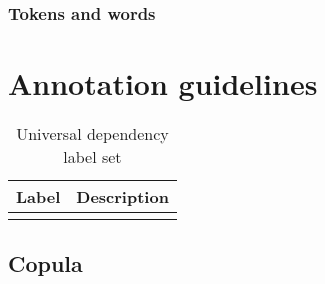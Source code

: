 \documentclass[a4paper,11pt, onecolumn,twoside]{article}
\begin{document}

\subsubsection{Tokens and words}


\section{Annotation guidelines}\label{sec:annotation}



\begin{table}[htbp]
	\centering
	\begin{tabular}{ll}
		\toprule
		\textbf{Label} & \textbf{Description} \\
		\midrule
				\\
 		\bottomrule
	\end{tabular}
	\caption{Universal dependency label set}
\end{table}

\subsection{Copula}
\end{document}
